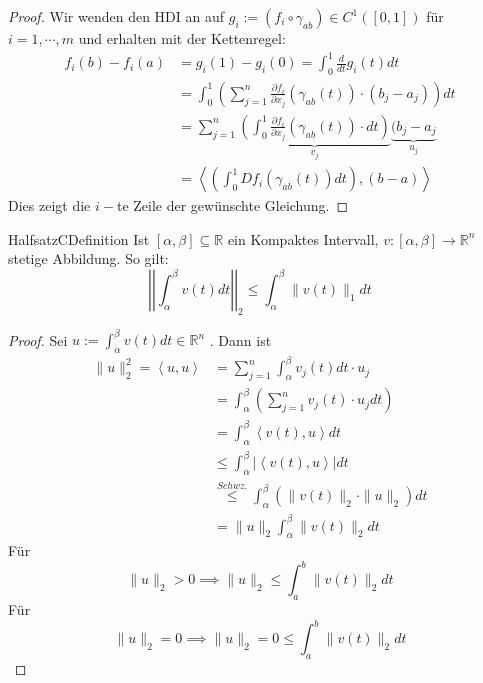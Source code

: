 \begin{proof}
	Wir wenden den HDI an auf $ g_{i}:= \left( f_i \circ \gamma_{ab} \right) \in C^{1}\left( [0,1] \right)$ für $ i = 1 , \cdots, m $ und
	erhalten mit der Kettenregel: 
	\begin{align*}
		f_i(b) - f_i(a) &= g_i(1) - g_i(0) = \int_{ 0 }^{ 1 } \frac{d}{dt} g_i(t) dt \\
						&=  \int_{ 0 }^{ 1 } \left( \sum_{j = 1}^{n} \frac{\partial f_i}{\partial x_j} ( \gamma_{ab}(t))
						\cdot (b_j - a_j)\right) dt \\
						&= \sum_{j=1}^{n} \underbrace{\left( \int_{ 0 }^{ 1 } \frac{\partial f_i}{\partial x_j} 
								\left( \gamma _{ab}(t) \right) \cdot
						dt \right)}_{v_j} \underbrace{ (b_j - a_j}_{u_j} \\
						&=  \left< \left( \int_{ 0 }^{ 1 } Df_i ( \gamma_{ab}(t)) dt \right) , (b-a) \right>
	\end{align*}
	Dies zeigt die $ i- $te Zeile der gewünschte Gleichung. 
\end{proof}

\begin{ibox}[]{Halfsatz}{CDefinition}
    Ist $ \left[ \alpha , \beta  \right] \subseteq \mathbb{R}  $ ein Kompaktes Intervall, $ v : \left[ \alpha , \beta 
	\right] \to \mathbb{R}^n  $ stetige Abbildung. So gilt: 
	$$ \left| \left|  \int_{ \alpha }^{ \beta } v(t) dt  \right|  \right| _{2} \leq \int_{ \alpha }^{ \beta } \|v(t)\|_{1} dt $$
\end{ibox}
\begin{proof}
	Sei $ u := \int_{ \alpha }^{ \beta } v(t) dt \in \mathbb{R}^n  $ . Dann ist 
\begin{align*}
	\| u \|_{2}^{2} = \left<u,u \right> &= \sum_{j=1}^{n} \int_{ \alpha }^{ \beta } v_j(t) dt \cdot u_j\\
	&= \int_{ \alpha  }^{ \beta  } \left( \sum_{j = 1}^{n}v_j(t) \cdot u_j dt \right) \\
	&=  \int_{ \alpha  }^{ \beta  } \left<v(t), u \right> dt \\
  & \leq \int_{ \alpha  }^{ \beta } \left| \left<v(t),u\right> \right| dt \\
  & \stackrel{Schwz.}{ \leq } \int_{ \alpha  }^{ \beta  } \left( \| v(t) \|_{2} \cdot \|u \|_{2} \right) dt \\
  &=  \|u \|_{2} \int_{ \alpha  }^{ \beta  } \|v(t) \|_{2}dt
\end{align*}
Für
$$
\|u \|_{2} > 0 \implies \|u \|_{2} \leq  \int_{ a }^{ b } \|v(t) \|_{2} dt
$$
Für
$$
\|u \|_{2} = 0 \implies \|u \|_{2} = 0 \leq  \int_{ a }^{ b } \|v(t) \|_{2} dt
$$
\end{proof}

